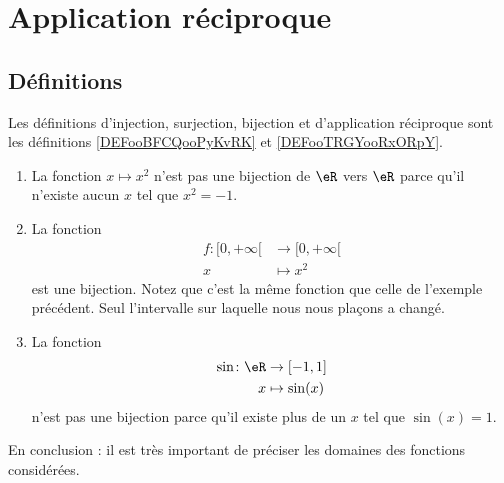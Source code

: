 
\section{Application réciproque}

\subsection{Définitions}

Les définitions d'injection, surjection, bijection et d'application réciproque sont les définitions \ref{DEFooBFCQooPyKvRK} et \ref{DEFooTRGYooRxORpY}.

\begin{example}     \label{EXooCWYHooLEciVj}
    \begin{enumerate}
        \item
            La fonction \( x\mapsto x^2\) n'est pas une bijection de \( \eR\) vers \( \eR\) parce qu'il n'existe aucun \( x\) tel que \( x^2=-1\).
        \item
            La fonction 
            \begin{equation}
                \begin{aligned}
                    f\colon \mathopen[ 0 , +\infty [&\to \mathopen[ 0 , +\infty [ \\
                    x&\mapsto x^2 
                \end{aligned}
            \end{equation}
            est une bijection. Notez que c'est la même fonction que celle de l'exemple précédent. Seul l'intervalle sur laquelle nous nous plaçons a changé.
        \item
            La fonction 
            \begin{equation}
                \begin{aligned}
                    \sin\colon \eR&\to \mathopen[ -1 , 1 \mathclose] \\
                    x&\mapsto \sin(x) 
                \end{aligned}
            \end{equation}
            n'est pas une bijection parce qu'il existe plus de un \( x\) tel que \( \sin(x)=1\). 
    \end{enumerate}
    En conclusion : il est très important de préciser les domaines des fonctions considérées.
\end{example}

